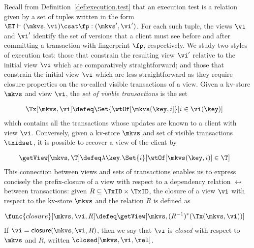 Recall from Definition~\ref{def:execution.test} that an execution test is a relation
given by a set of tuples written in the form
$\ET \vdash (\mkvs,\vi) \csat \fp: (\mkvs', \vi')$. 
For each such tuple, the views $\vi$ and $\vi'$ identify the set 
of versions that a client must see before and after committing a transaction 
with fingerprint $\fp$, respectively.
We study 
two styles of execution test: those that constrain the resulting view
$\vi'$ relative to the initial view $\vi$ which are comparatively straightforward; and those that constrain the initial view $\vi$ which
are less straightforward as they require closure properties on the
so-called visible transactions of a view. 
Given a kv-store $\mkvs$ and view $\vi$, the {\em set of visible
transactions} is the set

\vspace{-7pt}
{%
\displaymathfont
\begin{align*}
\Tx[\mkvs, \vi] & \defeq
\Set{\wtOf[\mkvs(\key, i] }[ i \in \vi(\key)]
\end{align*}
}%
which contains all the transactions whose updates are known to a
client with view $\vi$.  Conversely, given a kv-store $\mkvs$ and set
of visible transactions $\txidset$, it is possible to recover a view
of the client by%

\vspace{-7pt}
{%
\displaymathfont
\begin{align*}
    \getView[\mkvs, \T] & \defeq \lambda \key. \Set{i }[
\wtOf[\mkvs(\key, i)] \in \T]
\end{align*}
}%
This connection between views and sets of transactions enables us to express concisely 
the prefix-closure of a view with respect to a dependency relation $\rel$ between 
transactions: given $R \subseteq \TxID \times \TxID$, the closure of 
a view $\vi$ with respect to the kv-store $\mkvs$ and the relation $R$
is defined as%

\vspace{-7pt}
{%
\displaymathfont
\begin{align*}
\func{closure}[\mkvs, \vi, R] & \defeq \getView[\mkvs, (R^{-1})^{\ast}(\Tx(\mkvs, \vi))]
\end{align*}
}%
If $\vi = \mathsf{closure}(\mkvs, \vi, R)$, then we say that $\vi$ is \emph{closed} with 
respect to $\mkvs$ and $R$, written \( \closed[\mkvs,\vi,\rel]\).


